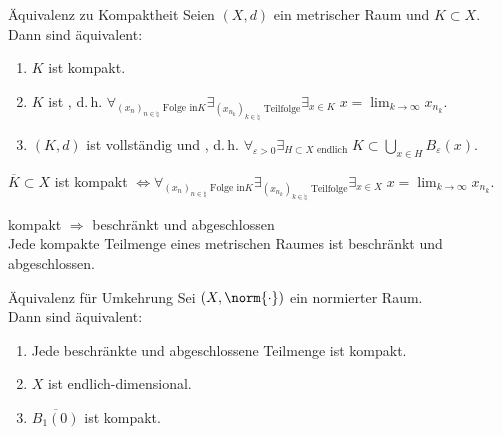 \begin{Satz}{Äquivalenz zu Kompaktheit}
    Seien $(X, d)$ ein metrischer Raum und $K \subset X$.\\
    Dann sind äquivalent:
    \begin{enumerate}
        \item
        $K$ ist kompakt.

        \item
        $K$ ist , d.\,h.
        $\forall_{(x_n)_{n \in \natural} \text{ Folge in} K}
        \exists_{(x_{n_k})_{k \in \natural} \text{ Teilfolge}} \exists_{x \in K}\;
        x = \lim_{k \to \infty} x_{n_k}$.

        \item
        $(K, d)$ ist vollständig und , d.\,h.
        $\forall_{\varepsilon > 0} \exists_{H \subset X \text{ endlich}}\;
        K \subset \bigcup_{x \in H} B_\varepsilon(x)$.
    \end{enumerate}
\end{Satz}

\begin{Bem}
    $\overline{K} \subset X$ ist kompakt $\iff
    \forall_{(x_n)_{n \in \natural} \text{ Folge in} K}
    \exists_{(x_{n_k})_{k \in \natural} \text{ Teilfolge}} \exists_{x \in X}\;
    x = \lim_{k \to \infty} x_{n_k}$.
\end{Bem}

\linie
\pagebreak

\begin{Satz}{kompakt $\Rightarrow$ beschränkt und abgeschlossen}\\
    Jede kompakte Teilmenge eines metrischen Raumes ist beschränkt und abgeschlossen.
\end{Satz}

\begin{Satz}{Äquivalenz für Umkehrung}
    Sei $(X, \norm{\cdot})$ ein normierter Raum.\\
    Dann sind äquivalent:
    \begin{enumerate}
        \item
        Jede beschränkte und abgeschlossene Teilmenge ist kompakt.

        \item
        $X$ ist endlich-dimensional.

        \item
        $\overline{B_1(0)}$ ist kompakt.
    \end{enumerate}
\end{Satz}

